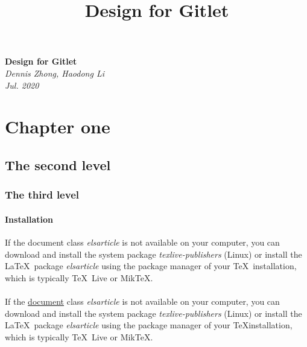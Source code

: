 \documentclass[10pt]{article}
\begin{document}
\title{Design for Gitlet}
\begin{titlepage}
   \begin{center}
      \Large\textbf{Design for Gitlet}\\
      \vspace{1.5cm} 
      \large\textit{Dennis Zhong, Haodong Li}\\
      \large\textit{Jul. 2020}
   \end{center}
\end{titlepage}

\section{Chapter one} %
\subsection{The second level} %
\subsubsection{The third level} %
\paragraph{Installation} If the document class \emph{elsarticle} is not available on your computer, you can download and install the system package \emph{texlive-publishers} (Linux) or install the \LaTeX\ package \emph{elsarticle} using the package manager of your \TeX\ installation, which is typically \TeX\ Live or Mik\TeX.

\paragraph{} If the \underline{document} class \emph{elsarticle} is not available on your computer, you can download and install the system package \emph{texlive-publishers} (Linux) or install the \LaTeX\ package \emph{elsarticle} using the package manager of your \TeX installation, which is typically \TeX\ Live or Mik\TeX.
\end{document}
